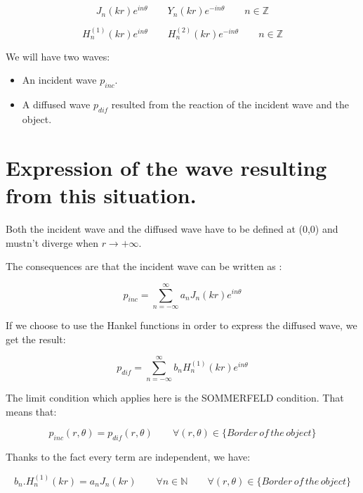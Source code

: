 \begin{equation}
J_{n}(kr)e^{in\theta} \qquad Y_{n}(kr)e^{-in\theta}  \qquad    n\in \mathbb{Z}
\end{equation}

\begin{equation}
H^{(1)}_{n}(kr)e^{in\theta} \qquad H^{(2)}_{n}(kr)e^{-in\theta}  \qquad    n\in \mathbb{Z}
\end{equation}

We will have two waves:
\begin{itemize}
\item An incident wave $p_{inc}$.
\item A diffused wave $p_{dif}$ resulted from the reaction of the incident wave and the object.
\end{itemize}

\chapter{Expression of the wave resulting from this situation.}

Both the incident wave and the diffused wave have to be defined at (0,0) and mustn't diverge when $r\rightarrow +\infty$.

The consequences are that the incident wave can be written as :

\begin{equation}
p_{inc} =  	\sum_{n=-\infty}^{\infty} a_n J_{n}(kr)e^{in\theta} 
\end{equation}

If we choose to use the Hankel functions in order to express the diffused wave, we get the result:

\begin{equation}
p_{dif} =  	\sum_{n=-\infty}^{\infty} b_{n}H^{(1)}_{n}(kr)e^{in\theta}
\end{equation}

The limit condition which applies here is the SOMMERFELD condition. That means that:

\begin{equation}
p_{inc}(r,\theta) = p_{dif}(r,\theta) \qquad \forall(r,\theta) \in \{Border\, of\, the\, object\}
\end{equation}

Thanks to the fact every term are independent, we have:

\begin{equation}
b_{n}.H^{(1)}_{n}(kr) = a_n J_{n}(kr) \qquad \forall n \in \mathbb{N} \qquad \forall(r,\theta) \in \{Border\, of\, the\, object\}
\end{equation}

